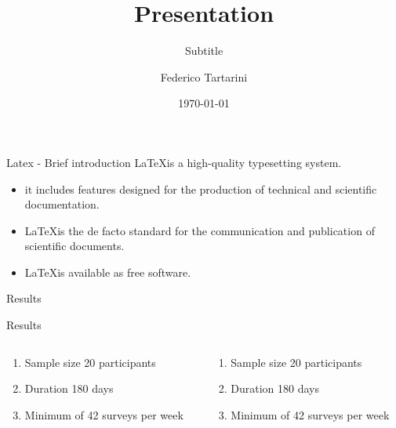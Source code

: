 \documentclass{beamer}
\title{Presentation}
\subtitle{Subtitle}
\date{\today}
\author{Federico Tartarini}
\institute{BEARS - Theme A}
\begin{document}
    \maketitle

    \begin{frame}{Latex - Brief introduction}
        \LaTeX is a high-quality typesetting system.
        \begin{itemize}
            \item it includes features designed for the production of technical and scientific documentation.
            \item \LaTeX is the de facto standard for the communication and publication of scientific documents.
            \item \LaTeX is available as free software.
        \end{itemize}
    \end{frame}

    \begin{frame}{Results}
        \centering
        
    \end{frame}

    \begin{frame}{Results}
        \begin{columns}
            \begin{column}{0.5\textwidth}
                \begin{enumerate}
                    \item Sample size 20 participants
                    \item Duration 180 days
                    \item Minimum of 42 surveys per week
                \end{enumerate}
            \end{column}
            \begin{column}{0.5\textwidth}
                \begin{enumerate}
                    \item Sample size 20 participants
                    \item Duration 180 days
                    \item Minimum of 42 surveys per week
                \end{enumerate}
            \end{column}
        \end{columns}
    \end{frame}
\end{document}
